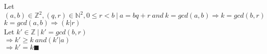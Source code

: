 \documentclass{article}
\begin{document}
\noindent Let $(a, b) \in \mathbb{Z}^2 , (q,r) \in \mathbb{N}^2, 0 \leq r < b
\ | \ 
a = bq + r \ and \ k = gcd(a, b) \Rightarrow k = gcd(b, r)$\\

\noindent $k = gcd(a, b) \Rightarrow (k|r)$\\
Let $k' \in \mathbb{Z} \ |\  k' = gcd(b, r)$\\
$\Rightarrow k' \geq k \ and (k'|a)$\\
$\Rightarrow k' = k \blacksquare$
\end{document}
